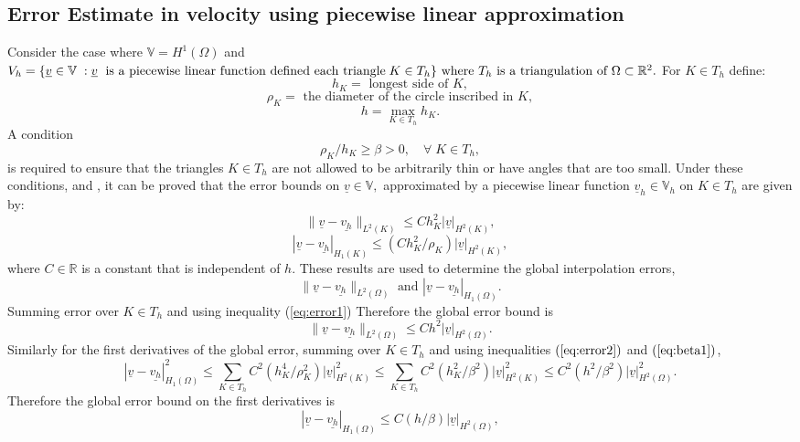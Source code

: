 \documentclass[11pt]{article}
\newcommand{\ul}{\underline}
\newcommand{\bigv}{\mathbb{V}}
\newcommand{\Om}{\Omega}
\begin{document}
\subsection{Error Estimate in velocity using piecewise linear approximation}
Consider the case where $\bigv = H^1(\Om)$ and \\$V_h = \{\ul{v}\in \bigv\;: \ul{v}\;\text{ is a piecewise linear function defined each triangle}\; K \in T_h\} \text{ where } \\T_h \text{ is a triangulation of } \Om\subset\mathbb{R}^2.$
For $K\in{T_h}$ define:
$$h_K = \text{ longest side of } K,$$
$$\rho_K = \text{ the diameter of the circle inscribed in } K,$$
$$h = \max_{K\in{T_h}}h_K.$$
A condition 
\begin{equation}
\label{eq:beta1}
\rho_K/h_K\geq\beta>0,\quad \forall\;K\in{T_h},
\end{equation}
is required to ensure that the triangles $K\in{T_h}$ are not allowed to be arbitrarily thin or have angles that are too small.
Under these conditions, \cite{Johnson2012} and \cite{Dupont1980}, it can be proved that the error bounds on $\ul{v}\in\bigv,$ approximated by a piecewise linear function $\ul{v}_h\in\bigv_h$ on $K\in{T_h}$ are given by:
\begin{equation}
\label{eq:error1}
\|\ul{v}-\ul{v_h}\|_{L^2(K)} \leq Ch_K^2|\ul{v}|_{H^2(K)},
\end{equation}
\begin{equation}
\label{eq:error2}
|\ul{v}-\ul{v_h}|_{H_1(K)} \leq (Ch_K^2/\rho_K)|\ul{v}|_{H^2(K)},
\end{equation}
where $C \in \mathbb{R}$ is a constant that is independent of $h$.
These results are used to determine the global interpolation errors, $$\|\ul{v}-\ul{v_h}\|_{L^2(\Om)} \text{ and } |\ul{v}-\ul{v_h}|_{H_1(\Om)}.$$
Summing error over $K\in{T_h}$ and using inequality (\ref{eq:error1})
Therefore the global error bound is
\begin{equation}
\label{eq:error3}
\|\ul{v}-\ul{v_h}\|_{L^2(\Om)} \leq Ch^2|\ul{v}|_{H^2(\Om)}.
\end{equation}
Similarly for the first derivatives of the global error, summing over $K\in{T_h}$ and using inequalities $(\ref{eq:error2})$ and $(\ref{eq:beta1})$,
$$|\ul{v}-\ul{v_h}|_{H_1(\Om)}^2 \leq \sum_{K\in{T_h}}C^2(h_K^4/\rho_K^2)|\ul{v}|_{H^2(K)}^2 \leq \sum_{K\in{T_h}}C^2(h_K^2/\beta^2)|\ul{v}|_{H^2(K)}^2 \leq C^2(h^2/\beta^2)|\ul{v}|_{H^2(\Om)}^2.$$
Therefore the global error bound on the first derivatives is
\begin{equation}
\label{eq:error4}
|\ul{v}-\ul{v_h}|_{H_1(\Om)} \leq C(h/\beta)|\ul{v}|_{H^2(\Om)},
\end{equation}
\end{document}
